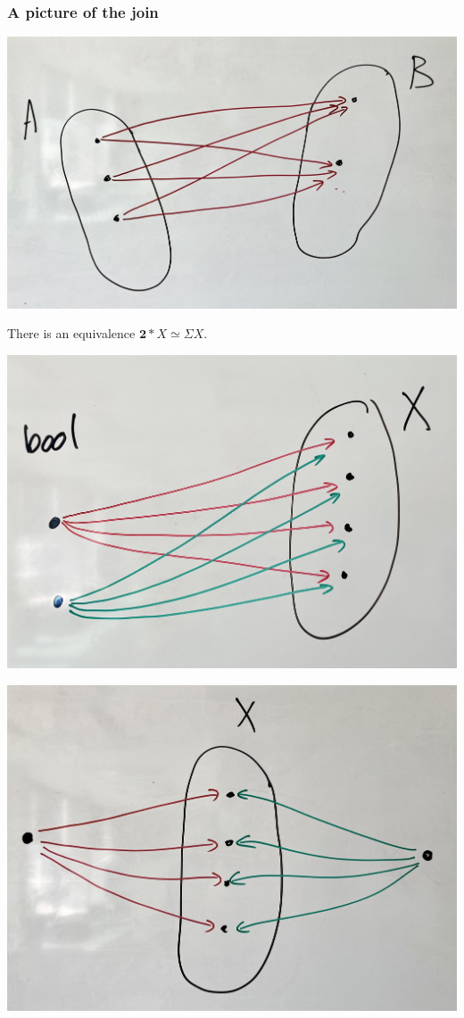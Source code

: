 \documentclass[handout]{beamer}
\begin{document}
\begin{frame}
  \frametitle{A picture of the join}
  \begin{center}
    \includegraphics[width=\textwidth]{join}
  \end{center}
\end{frame}

\begin{frame}
  \begin{theorem}
    There is an equivalence $\mathbf{2}\ast X\simeq \Sigma X$.
  \end{theorem}

  \begin{center}
    \includegraphics[width=.7\textwidth]{suspension-from-join-1}
  \end{center}
\end{frame}

\begin{frame}
  \begin{center}
    \includegraphics[width=.7\textwidth]{suspension-from-join-2}
  \end{center}
\end{frame}
\end{document}
